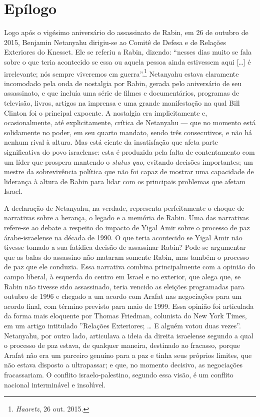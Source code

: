 \chapter[Epílogo\medskip]{Epílogo}

Logo após o vigésimo aniversário do assassinato de Rabin, em 26 de
outubro de 2015, Benjamin Netanyahu dirigiu-se ao Comitê de Defesa e de
Relações Exteriores do Knesset. Ele se referiu a Rabin, dizendo:
``nesses dias muito se fala sobre o que teria acontecido se essa ou
aquela pessoa ainda estivessem aqui {[}\ldots{}{]} é irrelevante; nós sempre
viveremos em guerra''.\footnote{\emph{Haaretz}, 26 out. 2015.} Netanyahu estava claramente incomodado
pela onda de nostalgia por Rabin, gerada pelo aniversário de seu
assassinato, e que incluía uma série de filmes e documentários, programas
de televisão, livros, artigos na imprensa e uma grande manifestação na
qual Bill Clinton foi o principal expoente. A nostalgia era
implicitamente e, ocasionalmente, até explicitamente, crítica de
Netanyahu --- que no momento está solidamente no poder, em seu quarto
mandato, sendo três consecutivos, e não há nenhum rival à altura. Mas
está ciente da insatisfação que afeta parte significativa do povo
israelense: esta é produzida pela falta de contentamento com um líder
que prospera mantendo o \emph{status quo}, evitando decisões importantes;
um mestre da sobrevivência política que não foi capaz de mostrar uma
capacidade de liderança à altura de Rabin para lidar com os principais
problemas que afetam Israel.

A declaração de Netanyahu, na verdade, representa perfeitamente o choque
de narrativas sobre a herança, o legado e a memória de Rabin. Uma das
narrativas refere-se ao debate a respeito do impacto de Yigal Amir sobre
o processo de paz árabe-israelense na década de 1990. O que teria
acontecido se Yigal Amir não tivesse tomado a sua fatídica decisão de
assassinar Rabin? Pode-se argumentar que as balas do assassino não
mataram somente Rabin, mas também o processo de paz que ele conduzia.
Essa narrativa combina principalmente com a opinião do campo liberal, à
esquerda do centro em Israel e no exterior, que alega que, se Rabin não
tivesse sido assassinado, teria vencido as eleições programadas para
outubro de 1996 e chegado a um acordo com Arafat nas negociações para um
acordo final, com término previsto para maio de 1999. Essa opinião foi
articulada da forma mais eloquente por Thomas Friedman, colunista do New
York Times, em um artigo intitulado ''Relações Exteriores; \ldots{} E alguém
votou duas vezes''. Netanyahu, por outro lado, articulava a ideia da
direita israelense segundo a qual o processo de paz estava, de qualquer
maneira, destinado ao fracasso, porque Arafat não era um parceiro genuíno
para a paz e tinha seus próprios limites, que não estava disposto a
ultrapassar; e que, no momento decisivo, as negociações fracassariam. O
conflito israelo-palestino, segundo essa visão, é um conflito nacional
interminável e insolúvel.


